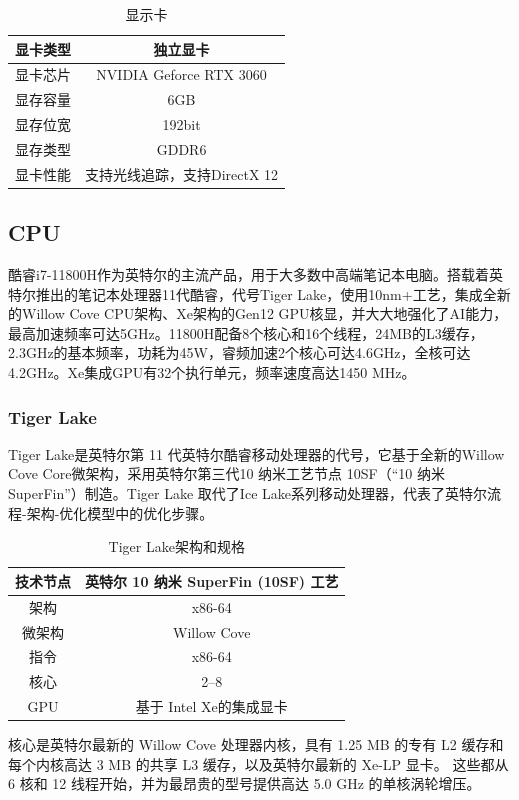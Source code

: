 \documentclass[a4paper]{article}
\begin{document}
\begin{table}[!htbp]
\centering
\begin{tabular}{|c|c|}
\hline
显卡类型& 独立显卡\\
\hline
显卡芯片& NVIDIA Geforce RTX 3060\\
\hline
显存容量& 6GB\\
\hline
显存位宽& 192bit\\
\hline
显存类型& GDDR6\\
\hline
显卡性能& 支持光线追踪，支持DirectX 12\\
\hline
\end{tabular}
\caption{显示卡}
\end{table}

\subsection{CPU}
酷睿i7-11800H作为英特尔的主流产品，用于大多数中高端笔记本电脑。搭载着英特尔推出的笔记本处理器11代酷睿，代号Tiger Lake，使用10nm+工艺，集成全新的Willow Cove CPU架构、Xe架构的Gen12 GPU核显，并大大地强化了AI能力，最高加速频率可达5GHz。11800H配备8个核心和16个线程，24MB的L3缓存，2.3GHz的基本频率，功耗为45W，睿频加速2个核心可达4.6GHz，全核可达4.2GHz。Xe集成GPU有32个执行单元，频率速度高达1450 MHz。
\subsubsection{Tiger Lake}
Tiger Lake是英特尔第 11 代英特尔酷睿移动处理器的代号，它基于全新的Willow Cove Core微架构，采用英特尔第三代10 纳米工艺节点 10SF（“10 纳米 SuperFin”）制造。Tiger Lake 取代了Ice Lake系列移动处理器，代表了英特尔流程-架构-优化模型中的优化步骤。

\begin{table}[!htbp]
\centering
\begin{tabular}{|c|c|}
\hline
技术节点& 英特尔 10 纳米 SuperFin (10SF) 工艺\\
\hline
架构& 	x86-64\\
\hline
微架构& 	Willow Cove\\
\hline
指令& x86-64\\
\hline
核心& 2–8\\
\hline
GPU& 	基于 Intel Xe的集成显卡\\
\hline
\end{tabular}
\caption{Tiger Lake架构和规格}
\end{table}

核心是英特尔最新的 Willow Cove 处理器内核，具有 1.25 MB 的专有 L2 缓存和每个内核高达 3 MB 的共享 L3 缓存，以及英特尔最新的 Xe-LP 显卡。 这些都从 6 核和 12 线程开始，并为最昂贵的型号提供高达 5.0 GHz 的单核涡轮增压。
\end{document}
